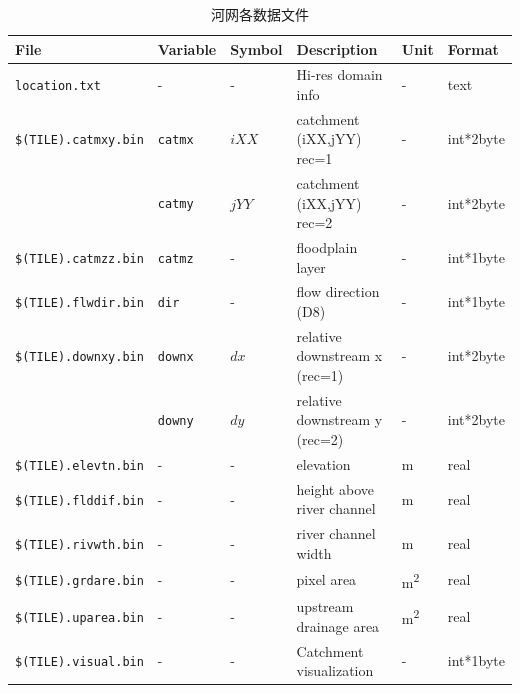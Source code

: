 \begin{table}[htbp]
    \centering
    \caption{河网各数据文件}
    \label{tab:河网各数据文件1}
    \begin{tabular}[h]{p{4cm}p{1.5cm}p{1.5cm}p{4cm}p{1cm}p{2cm}} %
    \toprule
    File                & Variable    & Symbol                        & Description                   & Unit      & Format \\ \midrule
    \texttt{location.txt}        & -        & -                             & Hi-res domain info            & -         & text   \\
    \texttt{\$(TILE).catmxy.bin} & \texttt{catmx}    & $iXX$         & catchment (iXX,jYY) rec=1     & - & int*2byte       \\
                                               & \texttt{catmy}    & $jYY$      & catchment (iXX,jYY) rec=2     & - & int*2byte      \\
    \texttt{\$(TILE).catmzz.bin} & \texttt{catmz}    & -                 & floodplain layer              & -  & int*1byte \\
    \texttt{\$(TILE).flwdir.bin} & \texttt{dir}      & -                        & flow direction (D8)         & -   & int*1byte  \\
    \texttt{\$(TILE).downxy.bin} & \texttt{downx}    & $dx$          & relative downstream x (rec=1) & - & int*2byte   \\
                                                & \texttt{downy}    & $dy$       & relative downstream y (rec=2) & - & int*2byte   \\
    \texttt{\$(TILE).elevtn.bin}    & -        & -                             & elevation                     & m                             & real    \\
    \texttt{\$(TILE).flddif.bin}      & -        & -                             & height above river channel    & m                             & real   \\
    \texttt{\$(TILE).rivwth.bin} & -        & -                                & river channel width           & m                             & real   \\
    \texttt{\$(TILE).grdare.bin} & -        & -                               & pixel area                    & \unit{m^2}                            & real   \\
    \texttt{\$(TILE).uparea.bin} & -       & -                               & upstream drainage area        & \unit{m^2}       & real   \\
    \texttt{\$(TILE).visual.bin}  & -        & -                               & Catchment visualization        & -                                                        & int*1byte       \\ \bottomrule
    \end{tabular}
\end{table}


